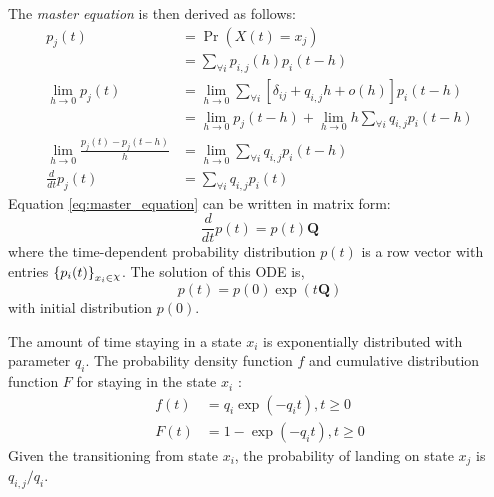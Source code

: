 The \textit{master equation} is then derived as follows:
\begin{align}
	p_{j}(t) &= \operatorname{Pr}(X(t) = x_{j}) \nonumber\\
		& =\sum_{\forall i} p_{i, j}(h) p_{i}(t-h) \nonumber \\
	\lim_{h\rightarrow 0} p_{j}(t) 
		& = \lim_{h\rightarrow 0} \sum_{\forall i} \left[ \delta_{ij}+q_{i,j} h+o(h)\right]  p_{i}(t-h) \nonumber \\ 
		& = \lim_{h\rightarrow 0} p_{j}(t-h) + \lim_{h\rightarrow 0} h \sum_{\forall i} q_{i,j} p_{i}(t-h) \nonumber \\
	\lim_{h\rightarrow 0} \frac{p_{j}(t) - p_{j}(t-h)}{h} 
		&= \lim_{h\rightarrow 0} \sum_{\forall i} q_{i,j} p_{i}(t-h) \nonumber\\
	\frac{d}{dt} p_{j}(t) & = \sum_{\forall i} q_{i,j} p_{i}(t)
	\label{eq:master_equation}
\end{align}
Equation \ref{eq:master_equation} can be written in matrix form:
\begin{equation}
\frac{d}{dt} p(t) = p(t)\textbf{Q}
\end{equation}
where the time-dependent probability distribution $ p(t) $ is a row vector with entries $ \left\lbrace p_{i}(t)\right\rbrace_{x_{i}\in \rchi} $. The solution of this ODE is, 
\begin{equation}
p(t)=p(0) \exp (t\textbf{Q})
\end{equation}
with initial distribution $ p(0) $.

The amount of time staying in a state $ x_{i} $ is exponentially distributed with parameter $ q_{i} $. The probability density function $ f $ and cumulative distribution function $ F $ for staying in the state $ x_{i} $ \cite{Nodelman1995}:
\begin{align}
f(t) & = q_{i} \exp \left(-q_{i} t\right), t\geq 0  \label{eq:f(t)_homo}\\
F(t) & = 1 - \exp \left(-q_{i} t\right), t\geq 0 
\end{align}
Given the transitioning from state $ x_{i} $, the probability of landing on state $ x_{j} $ is $ q_{i,j}/q_{i} $.
